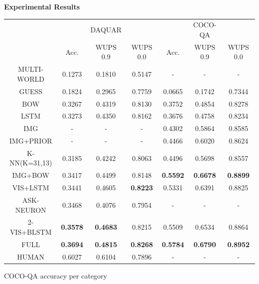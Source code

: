 \documentclass{beamer}
\renewcommand{\*}[1]{\textbf{#1}}
\begin{document}
\begin{frame}{}
\begin{columns}[T]
\begin{column}{0.32\linewidth}
\begin{block}{\bf{\large Experimental Results}}
\begin{table}[t!]
\begin{center}
\begin{tabular}{c | c c c | c c c}
\hline
            &          &  DAQUAR  &          &          &  COCO-QA &          \\
            & Acc.     & WUPS 0.9 & WUPS 0.0 & Acc.     & WUPS 0.9 & WUPS 0.0 \\
\hline         
MULTI-WORLD 
\cite{mal1} &  0.1273  &  0.1810  &  0.5147  &  -       &  -       &  -       \\
GUESS       &  0.1824  &  0.2965  &  0.7759  &  0.0665  &  0.1742  &  0.7344  \\
BOW         &  0.3267  &  0.4319  &  0.8130  &  0.3752  &  0.4854  &  0.8278  \\
LSTM        &  0.3273  &  0.4350  &  0.8162  &  0.3676  &  0.4758  &  0.8234  \\
IMG         &  -       &  -       &  -       &  0.4302  &  0.5864  &  0.8585  \\
IMG+PRIOR   &  -       &  -       &  -       &  0.4466  &  0.6020  &  0.8624  \\
K-NN(K=31,13)&  0.3185 &  0.4242  &  0.8063  &  0.4496  &  0.5698  &  0.8557  \\
IMG+BOW     &  0.3417  &  0.4499  &  0.8148  &\*{0.5592}&\*{0.6678}&\*{0.8899}\\
VIS+LSTM    &  0.3441  &  0.4605  &\*{0.8223}&  0.5331  &  0.6391  & 0.8825   \\
ASK-NEURON 
\cite{mal2} &  0.3468  &  0.4076  & 0.7954   &  -       &  -       &  -       \\
2-VIS+BLSTM &\*{0.3578}&\*{0.4683}& 0.8215   &  0.5509  &  0.6534  & 0.8864   \\
FULL        &\*{0.3694}&\*{0.4815}&\*{0.8268}&\*{0.5784}&\*{0.6790}&\*{0.8952}\\
\hline
HUMAN       &  0.6027  &  0.6104  &  0.7896  &  -       &  -       &  -       \\
\hline
\end{tabular}

\end{center}
\end{table}
\vfill

\begin{table}[t!]
\caption{COCO-QA accuracy per category}
\small
\label{tab:cocoqa_acc_breakdown}
\begin{center}


\end{center}
\end{table}
\end{block}
\end{column}
\end{columns}
\end{frame}
\end{document}
